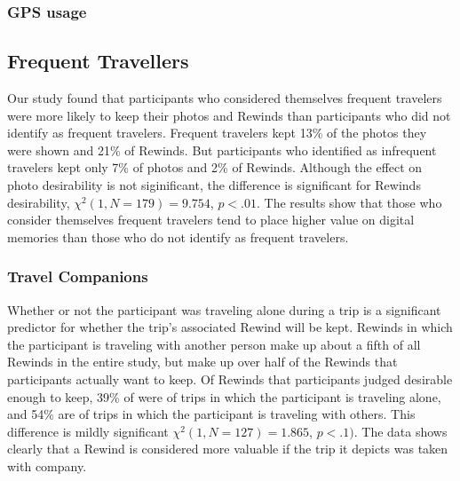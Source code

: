 \documentclass{sigchi}
\begin{document}
\subsubsection{GPS usage}

\subsection{Frequent Travellers}
Our study found that participants who considered themselves frequent travelers were more likely to keep their photos and Rewinds than participants who did not identify as frequent travelers. Frequent travelers kept 13\% of the photos they were shown and 21\% of Rewinds. But participants who identified as infrequent travelers kept only 7\% of photos and 2\% of Rewinds. Although the effect on photo desirability is not siginificant, the difference is significant for Rewinds desirability, $\chi^2(1, N=179) = 9.754$, $p <.01$. The results show that those who consider themselves frequent travelers tend to place higher value on digital memories than those who do not identify as frequent travelers.

\subsubsection{Travel Companions}
Whether or not the participant was traveling alone during a trip is a significant predictor for whether the trip's associated Rewind will be kept. Rewinds in which the participant is traveling with another person make up about a fifth of all Rewinds in the entire study, but make up over half of the Rewinds that participants actually want to keep. Of Rewinds that participants judged desirable enough to keep, 39\% of were of trips in which the participant is traveling alone, and 54\% are of trips in which the participant is traveling with others. This difference is mildly significant $\chi^2(1, N=127) = 1.865$, $p <.1)$. The data shows clearly that a Rewind is considered more valuable if the trip it depicts was taken with company. 
\end{document}
